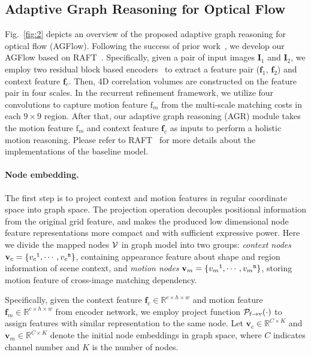\documentclass[letterpaper]{article} %
\begin{document}
\subsection{Adaptive Graph Reasoning for Optical Flow}

Fig.~\ref{fig:2} depicts an overview of the proposed adaptive graph reasoning for optical flow (AGFlow). Following the success of prior work~\cite{Jiang2021LearningTE}, we develop our AGFlow based on RAFT~\cite{Teed2020RAFTRA}. Specifically, given a pair of input images ${\mathbf I}_1$ and ${\mathbf I}_2$, we employ two residual block based encoders~\cite{He2016DeepRL} to extract a feature pair (${\mathbf f}_1$, ${\mathbf f}_2$) and context feature ${\mathbf f}_c$. Then, 4D correlation volumes are constructed on the feature pair in four scales. In the recurrent refinement framework, we utilize four convolutions to capture motion feature ${\mathrm f}_m$ from the multi-scale matching costs in each $9 \times 9$ region. After that, our adaptive graph reasoning (AGR) module takes the motion feature ${\mathrm f}_m$ and context feature ${\mathbf f}_c$ as inputs to perform a holistic motion reasoning. Please refer to RAFT~\cite{Teed2020RAFTRA} for more details about the implementations of the baseline model.

\paragraph{Node embedding.}
The first step is to project context and motion features in regular coordinate space into graph space. The projection operation decouples positional information from the original grid feature, and makes the produced low dimensional node feature representations more compact and with sufficient expressive power.
Here we divide the mapped nodes $\cal V$ in graph model into two groups: {\em context nodes} ${\mathbf v}_c = \{{v_{c}}^{\tt 1}, \cdots, {v_{c}}^{\tt n}\}$, containing appearance feature about shape and region information of scene context, and {\em motion nodes} ${\mathbf v}_m = \{{v_{m}}^{\tt 1}, \cdots, {v_{m}}^{\tt n}\}$, storing motion feature of cross-image matching dependency.

Specifically, given the context feature ${\mathbf f}_c \in \mathbb{R}^{c \times h \times w}$ and motion feature ${\mathbf f}_m \in \mathbb{R}^{c \times h \times w}$ from encoder network, we employ project function ${\cal P}_{{\mathrm f}\rightarrow {\mathrm v}}(\cdot)$ to assign features with similar representation to the same node. Let ${\mathbf v}_c \in \mathbb{R}^{C \times K}$ and ${\mathbf v}_m \in \mathbb{R}^{C \times K}$ denote the initial node embeddings in graph space, where $C$ indicates channel number and $K$ is the number of nodes.
\end{document}
